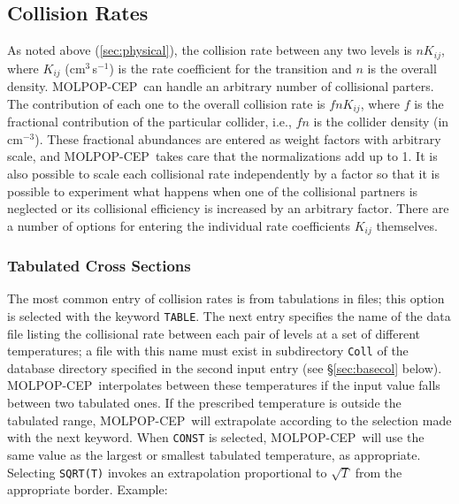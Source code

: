 \documentclass[12pt]{article}
\def\M{MOLPOP-CEP}
\begin{document}
\subsection{Collision Rates}
\label{sec:collisions}

As noted above (\ref{sec:physical}), the collision rate between any two levels
is $nK_{ij}$, where $K_{ij}$ (cm$^3$\,s$^{-1}$) is the rate coefficient for the
transition and $n$ is the overall density. \M\ can handle an arbitrary number
of collisional parters. The contribution of each one to the overall collision
rate is $fnK_{ij}$, where $f$ is the fractional contribution of the particular
collider, i.e., $fn$ is the collider density (in cm$^{-3}$). These fractional
abundances are entered as weight factors with arbitrary scale, and \M\ takes
care that the normalizations add up to 1. It is also possible to scale each
collisional rate independently by a factor so that it is possible to experiment
what happens when one of the collisional partners is neglected or its
collisional efficiency is increased by an arbitrary factor. There are a number
of options for entering the individual rate coefficients $K_{ij}$ themselves.


\subsubsection{Tabulated Cross Sections}

The most common entry of collision rates is from tabulations in files; this
option is selected with the keyword \texttt{TABLE}. The next entry specifies
the name of the data file listing the collisional rate between each pair of
levels at a set of different temperatures; a file with this name must exist in
subdirectory {\tt Coll} of the database directory specified in the second input
entry (see \S\ref{sec:basecol} below). \M\ interpolates between these temperatures if the
input value falls between two tabulated ones. If the prescribed temperature is
outside the tabulated range, \M\ will extrapolate according to the selection
made with the next keyword. When \texttt{CONST} is selected, \M\ will use the
same value as the largest or smallest tabulated temperature, as appropriate.
Selecting \texttt{SQRT(T)} invokes an extrapolation proportional to $\sqrt{T}$
from the appropriate border. Example:
\end{document}
